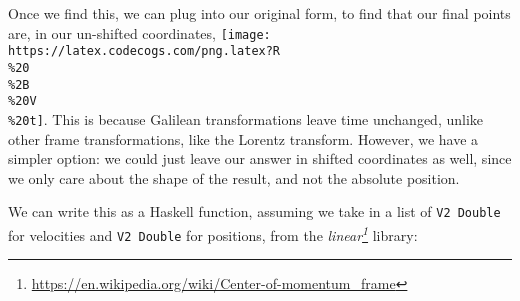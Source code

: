 \documentclass[]{article}
\newenvironment{Shaded}{}{}
\newcommand{\CommentTok}[1]{\textcolor[rgb]{0.38,0.63,0.69}{\textit{#1}}}
\newcommand{\DataTypeTok}[1]{\textcolor[rgb]{0.56,0.13,0.00}{#1}}
\newcommand{\DecValTok}[1]{\textcolor[rgb]{0.25,0.63,0.44}{#1}}
\newcommand{\FunctionTok}[1]{\textcolor[rgb]{0.02,0.16,0.49}{#1}}
\newcommand{\KeywordTok}[1]{\textcolor[rgb]{0.00,0.44,0.13}{\textbf{#1}}}
\newcommand{\NormalTok}[1]{#1}
\newcommand{\OtherTok}[1]{\textcolor[rgb]{0.00,0.44,0.13}{#1}}
\renewcommand{\href}[2]{#2\footnote{\url{#1}}}
\begin{document}
Once we find this, we can plug into our original form, to find that our final
points are, in our un-shifted coordinates,
\texttt{[image: https://latex.codecogs.com/png.latex?R\\\%20\\\%2B\\\%20V\\\%20t]}. This
is because Galilean transformations leave time unchanged, unlike other frame
transformations, like the Lorentz transform. However, we have a simpler option:
we could just leave our answer in shifted coordinates as well, since we only
care about the shape of the result, and not the absolute position.

We can write this as a Haskell function, assuming we take in a list of
\texttt{V2\ Double} for velocities and \texttt{V2\ Double} for positions, from
the \emph{\href{https://en.wikipedia.org/wiki/Center-of-momentum_frame}{linear}}
library:

\begin{Shaded}
\end{Shaded}
\end{document}

